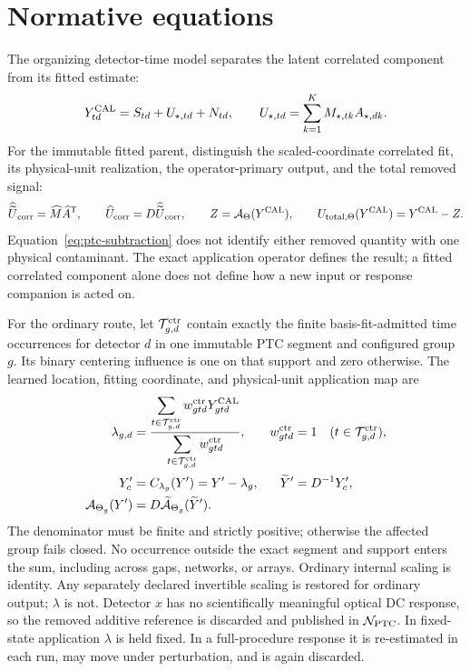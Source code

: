 \section{Normative equations}
\label{sec:normative-equations}

The organizing detector-time model separates the latent correlated component
from its fitted estimate:
\begin{equation}
Y^{\rm CAL}_{td}=S_{td}+U_{\star,td}+N_{td},
\qquad
U_{\star,td}=\sum_{k=1}^{K}M_{\star,tk}A_{\star,dk}.
\label{eq:ptc-model}
\end{equation}
For the immutable fitted parent, distinguish the scaled-coordinate correlated
fit, its physical-unit realization, the operator-primary output, and the total
removed signal:
\begin{equation}
\widehat{\widetilde U}_{\rm corr}
  =\widehat M\widehat A^{\mathsf T},
\qquad
\widehat U_{\rm corr}=D\widehat{\widetilde U}_{\rm corr},
\qquad
Z=\mathcal A_{\Theta}(Y^{\rm CAL}),
\qquad
U_{{\rm total},\Theta}(Y^{\rm CAL})=Y^{\rm CAL}-Z.
\label{eq:ptc-subtraction}
\end{equation}
Equation~\ref{eq:ptc-subtraction} does not identify either removed quantity
with one physical contaminant. The exact application operator defines the
result; a fitted correlated component alone does not define how a new input
or response companion is acted on.

For the ordinary route, let $\mathcal T^{\rm ctr}_{g,d}$ contain exactly the
finite basis-fit-admitted time occurrences for detector $d$ in one immutable
PTC segment and configured group $g$. Its binary centering influence is one on
that support and zero otherwise. The learned location, fitting coordinate, and
physical-unit application map are
\begin{equation}
\begin{aligned}
\lambda_{g,d}
&=\frac{\displaystyle\sum_{t\in\mathcal T^{\rm ctr}_{g,d}}
 w^{\rm ctr}_{gtd}Y^{\rm CAL}_{gtd}}
 {\displaystyle\sum_{t\in\mathcal T^{\rm ctr}_{g,d}}
 w^{\rm ctr}_{gtd}},
&w^{\rm ctr}_{gtd}&=1
\quad(t\in\mathcal T^{\rm ctr}_{g,d}),\\
Y'_c&=C_{\lambda_g}(Y')=Y'-\lambda_g,
&\widetilde Y'&=D^{-1}Y'_c,\\
\mathcal A_{\Theta_g}(Y')
&=D\widetilde{\mathcal A}_{\Theta_g}(\widetilde Y').
\end{aligned}
\label{eq:center-scale}
\end{equation}
The denominator must be finite and strictly positive; otherwise the affected
group fails closed. No occurrence outside the exact segment and support enters
the sum, including across gaps, networks, or arrays. Ordinary internal scaling
is identity. Any separately declared invertible scaling is restored for
ordinary output; $\lambda$ is not. Detector $x$ has
no scientifically meaningful optical DC response, so the removed additive
reference is discarded and published in $\mathcal N_{\rm PTC}$. In
fixed-state application $\lambda$ is held fixed. In a full-procedure response
it is re-estimated in each run, may move under perturbation, and is again
discarded.

